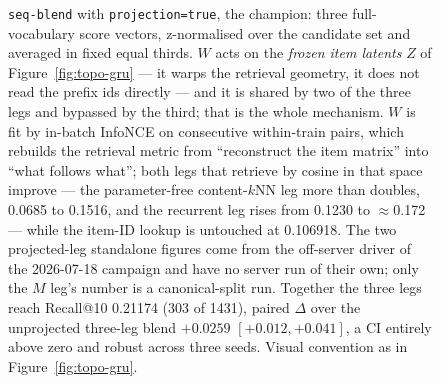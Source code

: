 \begin{figure}[ht]
  \caption{\texttt{seq-blend} with \texttt{projection=true}, the champion:
    three full-vocabulary score vectors, z-normalised over the candidate set
    and averaged in fixed equal thirds. $W$ acts on the \emph{frozen item
    latents} $Z$ of Figure~\ref{fig:topo-gru} --- it warps the retrieval geometry,
    it does not read the prefix ids directly --- and it is shared by two of the
    three legs and bypassed by the third; that is the whole mechanism. $W$ is fit by in-batch InfoNCE on consecutive within-train
    pairs, which rebuilds the retrieval metric from ``reconstruct the item
    matrix'' into ``what follows what''; both legs that retrieve by cosine in
    that space improve --- the parameter-free content-$k$NN leg more than
    doubles, \num{0.0685} to \num{0.1516}, and the recurrent leg rises from
    \num{0.1230} to $\approx$\num{0.172} --- while the item-ID lookup is
    untouched at \num{0.106918}. The two projected-leg standalone figures come
    from the off-server driver of the 2026-07-18 campaign and have no server
    run of their own; only the $M$ leg's number is a canonical-split run.
    Together the three legs reach Recall@10 \num{0.21174} (\num{303} of
    \num{1431}), paired $\Delta$ over the unprojected three-leg blend
    $+\num{0.0259}$ $[+0.012, +0.041]$, a CI entirely above zero and robust
    across three seeds. Visual convention as in Figure~\ref{fig:topo-gru}.}
  \label{fig:topo-blend}
\end{figure}


